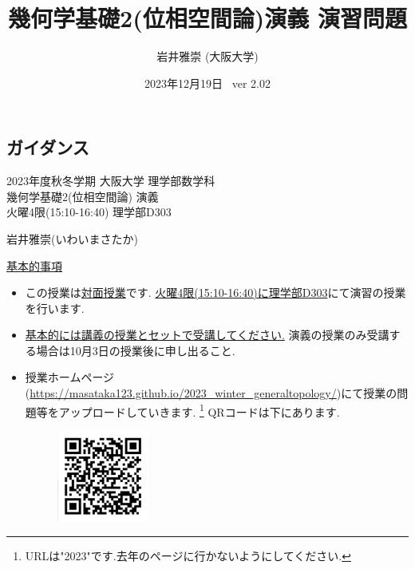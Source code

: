 \documentclass[dvipdfmx,a4paper,11pt]{article}
\title{幾何学基礎2(位相空間論)演義 演習問題}
\author{岩井雅崇 (大阪大学)}
\date{2023年12月19日 \, ver 2.02}
\theoremstyle{definition}
\begin{document}
\maketitle
\tableofcontents
\newpage

\begin{center}
\setcounter{section}{-1}
\section{ガイダンス}
\label{sec-guide}
\end{center}

\begin{center}
{\Large 2023年度秋冬学期 大阪大学 理学部数学科 \\ 幾何学基礎2(位相空間論) 演義} \\
 火曜4限(15:10-16:40) 理学部D303
\end{center}
\begin{flushright}
 岩井雅崇(いわいまさたか) \\
\end{flushright}
{\Large \underline{基本的事項}}
\begin{itemize}
  \setlength{\parskip}{0cm} %
  \setlength{\itemsep}{0cm} %
\item この授業は\underline{対面授業}です. \underline{火曜4限(15:10-16:40)に理学部D303}にて演習の授業を行います.
\item \underline{基本的には講義の授業とセットで受講してください.} 演義の授業のみ受講する場合は10月3日の授業後に申し出ること. 
\item 授業ホームページ(\url{https://masataka123.github.io/2023_winter_generaltopology/})にて授業の問題等をアップロードしていきます. \footnote{URLは"2023"です.去年のページに行かないようにしてください. }
QRコードは下にあります.
\begin{figure}[htbp]
\begin{center}
 \includegraphics[height=30mm, width=30mm]{genetopo.png}
\end{center}
\end{figure}
\end{itemize}

\end{document}
